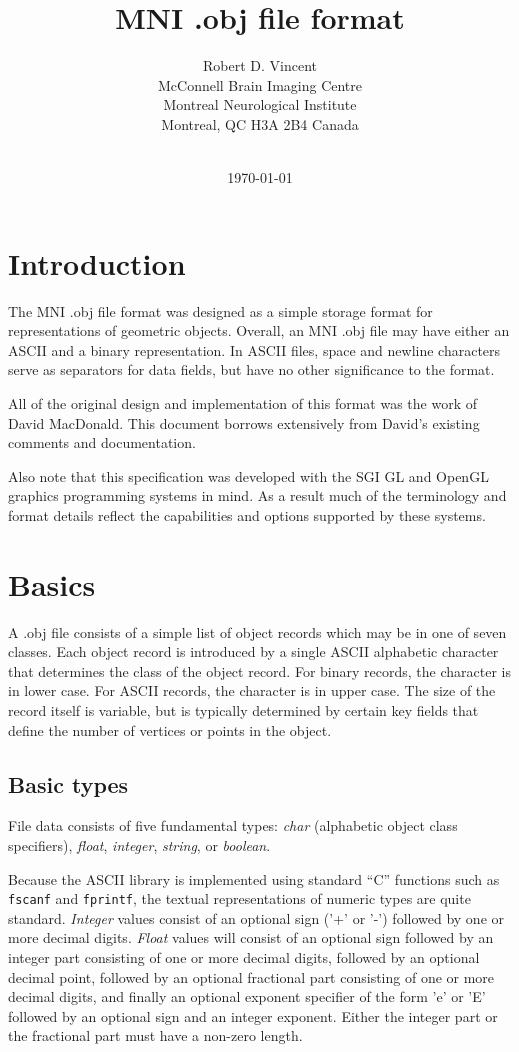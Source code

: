 \documentclass{article}
\title{MNI .obj file format}
\author{Robert D. Vincent \\
McConnell Brain Imaging Centre \\
Montreal Neurological Institute \\
Montreal, QC H3A 2B4 Canada \\~\\
}
\date{\today}
\newcommand{\kw}[1]{{\tt \mbox{#1}}}
\begin{document}
\maketitle
\tableofcontents
\newpage

\section{Introduction}

The MNI .obj file format was designed as a simple storage format for
representations of geometric objects.  Overall, an
MNI .obj file may have either an ASCII and a binary representation.  In
ASCII files, space and newline characters serve as separators for data
fields, but have no other significance to the format.

All of the original design and implementation of this format was the
work of David MacDonald.  This document borrows extensively from David's
existing comments and documentation.

Also note that this specification was developed with the SGI GL and
OpenGL graphics programming systems in mind.  As a result much of the
terminology and format details reflect the capabilities and options
supported by these systems.

\section{Basics}

A .obj file consists of a simple list of object records which may be in
one of seven classes.  Each object record is introduced by a single
ASCII alphabetic character that determines the class of the object
record.  For binary records, the character is in lower case.  For ASCII
records, the character is in upper case.  The size of the record itself
is variable, but is typically determined by certain key fields that
define the number of vertices or points in the object.

\subsection{Basic types}

File data consists of five fundamental types: {\it char} (alphabetic
object class specifiers), {\it float}, {\it integer}, {\it string}, or
{\it boolean}.

Because the ASCII library is implemented using standard ``C'' functions
such as \kw{fscanf} and \kw{fprintf}, the textual representations of
numeric types are quite standard.  {\it Integer} values
consist of an optional sign ('+' or '-') followed by one or more decimal
digits. {\it Float} values will consist of an optional sign followed
by an integer part consisting of one or more decimal digits, followed by
an optional decimal point, followed by an optional fractional part
consisting of one or more decimal digits, and finally an optional
exponent specifier of the form 'e' or 'E' followed by an optional sign
and an integer exponent.  Either the integer part or the fractional part
must have a non-zero length.
\end{document}
